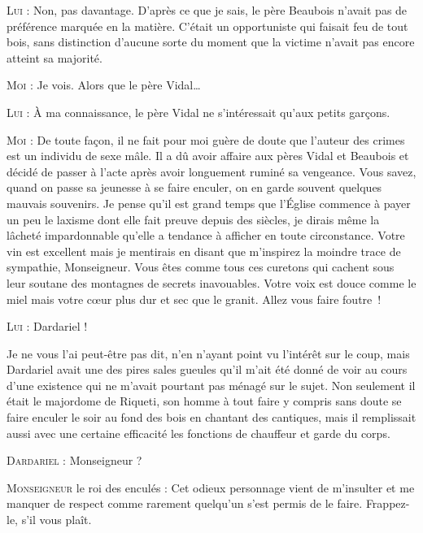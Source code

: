 \begin{dialogue}
\textsc{Lui} : Non, pas davantage. D’après ce que je sais, le père Beaubois n’avait pas de préférence marquée en la matière. C’était un opportuniste qui faisait feu de tout bois, sans distinction d’aucune sorte du moment que la victime n’avait pas encore atteint sa majorité.

\textsc{Moi} : Je vois. Alors que le père Vidal…

\textsc{Lui} : À ma connaissance, le père Vidal ne s’intéressait qu’aux petits garçons.

\textsc{Moi} : De toute façon, il ne fait pour moi guère de doute que l’auteur des crimes est un individu de sexe mâle. Il a dû avoir affaire aux pères Vidal et Beaubois et décidé de passer à l’acte après avoir longuement ruminé sa vengeance. Vous savez, quand on passe sa jeunesse à se faire enculer, on en garde souvent quelques mauvais souvenirs. Je pense qu’il est grand temps que l’Église commence à payer un peu le laxisme dont elle fait preuve depuis des siècles, je dirais même la lâcheté impardonnable qu’elle a tendance à afficher en toute circonstance. Votre vin est excellent mais je mentirais en disant que m’inspirez la moindre trace de sympathie, Monseigneur. Vous êtes comme tous ces curetons qui cachent sous leur soutane des montagnes de secrets inavouables. Votre voix est douce comme le miel mais votre cœur plus dur et sec que le granit. Allez vous faire foutre~!

\textsc{Lui} : Dardariel !

\end{dialogue}

Je ne vous l’ai peut-être pas dit, n’en n’ayant point vu l’intérêt sur le coup, mais Dardariel avait une des pires sales gueules qu’il m’ait été donné de voir au cours d’une existence qui ne m’avait pourtant pas ménagé sur le sujet. Non seulement il était le majordome de Riqueti, son homme à tout faire y compris sans doute se faire enculer le soir au fond des bois en chantant des cantiques, mais il remplissait aussi avec une certaine efficacité les fonctions de chauffeur et garde du corps.

\begin{dialogue}

\textsc{Dardariel} : Monseigneur ?

\textsc{Monseigneur} le roi des enculés : Cet odieux personnage vient de m’insulter et me manquer de respect comme rarement quelqu’un s’est permis de le faire. Frappez-le, s’il vous plaît.

\end{dialogue}

